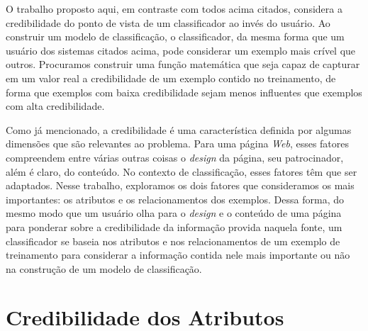 O trabalho proposto aqui, em contraste com todos acima citados, considera a credibilidade do ponto de vista de um classificador ao invés do usuário. Ao construir um modelo de classificação, o classificador, da mesma forma que um usuário dos sistemas citados acima, pode considerar um exemplo mais crível que outros. Procuramos construir uma função matemática que seja capaz de capturar em um valor real a credibilidade de um exemplo contido no treinamento, de forma que exemplos com baixa credibilidade sejam menos influentes que exemplos com alta credibilidade.

Como já mencionado, a credibilidade é uma característica definida por algumas dimensões que são relevantes ao problema. Para uma página \textit{Web}, esses fatores compreendem entre várias outras coisas o \textit{design} da página, seu patrocinador, além é claro, do conteúdo. No contexto de classificação, esses fatores têm que ser adaptados. Nesse trabalho, exploramos os dois fatores que consideramos os mais importantes: os atributos e os relacionamentos dos exemplos. Dessa forma, do mesmo modo que um usuário olha para o \textit{design} e o conteúdo de uma página para ponderar sobre a credibilidade da informação provida naquela fonte, um classificador se baseia nos atributos e nos relacionamentos de um exemplo de treinamento para considerar a informação contida nele mais importante ou não na construção de um modelo de classificação.



\section{Credibilidade dos Atributos}
\label{sec::supervised}

